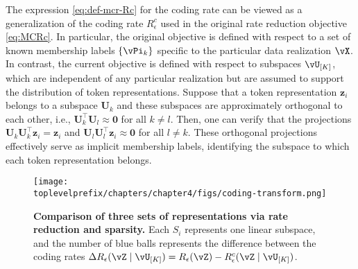 \documentclass[../../book-main.tex]{subfiles}
\begin{document}
\begin{remark}
    The expression \eqref{eq:def-mcr-Rc} for the coding rate can be viewed as a generalization of the coding rate \(R_\epsilon^{c}\) used in the original rate reduction objective \eqref{eq:MCRc}. In particular, the original objective is defined with respect to a set of known membership labels \(\{\vPi_{k}\}\) specific to the particular data realization \(\vX\). In contrast, the current objective is defined with respect to subspaces \(\vU_{[K]}\), which are independent of any particular realization but are assumed to support the distribution of token representations. Suppose that a token representation $\bm z_i$ belongs to a subspace $\bm U_k$ and these subspaces are approximately orthogonal to each other, i.e., $\bm U_k^\top \bm U_l \approx \bm 0$ for all $k \neq l$. Then, one can verify that the projections $\bm U_k\bm U_k^\top \bm z_i  = \bm z_i$ and  $\bm U_l\bm U_l^\top \bm z_i \approx \bm 0$ for all $l \neq k$. These orthogonal projections effectively serve as implicit membership labels, identifying the subspace to which each token representation belongs. 
\end{remark}



\begin{figure}[t!]
     \centering
         \texttt{[image: \\toplevelprefix/chapters/chapter4/figs/coding-transform.png]}
     \caption{ \small\textbf{Comparison of three sets of  representations via rate reduction and sparsity.} Each $S_i$ represents one linear subspace, and the number of blue balls represents the difference between the coding rates $\Delta R_{\epsilon}(\vZ \mid \vU_{[K]}) = R_\epsilon(\vZ) - R^c_\epsilon(\vZ \mid \vU_{[K]})$. 
     }
        \label{fig:sparse-rate-reduction-diagram}
\end{figure}
\end{document}
